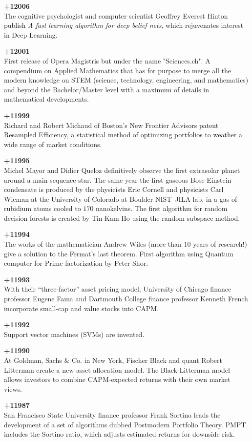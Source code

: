 \textbf{+12006}\\
The cognitive psychologist and computer scientist Geoffrey Everest Hinton publish \textit{A fast learning algorithm for deep belief nets}, which rejuvenates interest in Deep Learning. 

\textbf{+12001}\\
First release of Opera Magistris but under the name "Sciences.ch". A compendium on Applied Mathematics that has for purpose to merge all the modern knowledge on STEM (science, technology, engineering, and mathematics) and beyond the Bachelor/Master level with a maximum of details in mathematical developments.

\textbf{+11999}\\
Richard and Robert Michaud of Boston’s New Frontier Advisors patent Resampled Efficiency, a statistical method of optimizing portfolios to weather a wide range of market conditions.

\textbf{+11995}\\
Michel Mayor and Didier Queloz definitively observe the first extrasolar planet around a main sequence star. The same year the first gaseous Bose-Einstein condensate is produced by the physicists Eric Cornell and physicists Carl Wieman at the University of Colorado at Boulder NIST–JILA lab, in a gas of rubidium atoms cooled to $170$ nanokelvins. The first algorithm for random decision forests is created by Tin Kam Ho using the random subspace method.

\textbf{+11994}\\
The works of the mathematician Andrew Wiles (more than 10 years of research!) give a solution to the Fermat's last theorem. First algorithm using Quantum computer for Prime factorization by Peter Shor.

\textbf{+11993}\\
With their “three-factor” asset pricing model, University of Chicago finance professor Eugene Fama and Dartmouth College finance professor Kenneth French incorporate small-cap and value stocks into CAPM.

\textbf{+11992}\\
Support vector machines (SVMs) are invented.

\textbf{+11990}\\
At Goldman, Sachs \& Co. in New York, Fischer Black and quant Robert Litterman create a new asset allocation model. The Black-Litterman model allows investors to combine CAPM-expected returns with their own market views.

\textbf{+11987}\\
San Francisco State University finance professor Frank Sortino leads the development of a set of algorithms dubbed Postmodern Portfolio Theory. PMPT includes the Sortino ratio, which adjusts estimated returns for downside risk.

